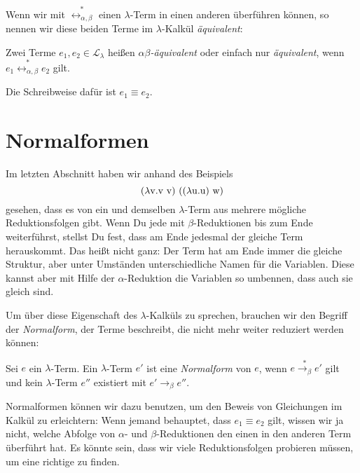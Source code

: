 Wenn wir mit $\overset{\ast}{\leftrightarrow_{\alpha,\beta}}$ einen
$\lambda$-Term in einen anderen überführen können, so nennen wir diese
beiden Terme im $\lambda$-Kalkül 
\textit{äquivalent}:
%
\begin{definition}
  Zwei Terme $e_1, e_2\in\mathcal{L}_{\lambda}$ heißen
  \textit{$\alpha\beta$-äquivalent} oder einfach nur
  \textit{äquivalent}, wenn
  \(e_1 \overset{\ast}{\leftrightarrow_{\alpha,\beta}} e_2\)
  gilt.

  Die Schreibweise dafür ist \(e_1\equiv e_2\).
\end{definition}

\section{Normalformen}
\label{sec:normalformen}


Im letzten Abschnitt haben wir anhand des Beispiels
\begin{displaymath}
(\lambda \mathrm v .\mathrm v~\mathrm v)~((\lambda \mathrm u.\mathrm u)~\mathrm w)
\end{displaymath}
%
gesehen, dass es von ein und demselben $\lambda$-Term aus mehrere
mögliche Reduktionsfolgen gibt.  Wenn Du jede mit $\beta$-Reduktionen
bis zum Ende weiterführst, stellst Du fest, dass am Ende jedesmal der
gleiche Term herauskommt.  Das heißt nicht ganz: Der Term hat am Ende
immer die gleiche Struktur, aber unter Umständen unterschiedliche
Namen für die Variablen.  Diese kannst aber mit Hilfe der
$\alpha$-Reduktion die Variablen so umbennen, dass auch sie gleich sind.

Um über diese Eigenschaft des $\lambda$-Kalküls zu sprechen, brauchen
wir den Begriff der \textit{Normalform}, der Terme beschreibt, die
nicht mehr weiter reduziert werden können:
%
\begin{definition}[Normalform]
  Sei $e$ ein $\lambda$-Term.  Ein $\lambda$-Term $e'$ ist eine
  \textit{Normalform} von $e$, wenn
  $e\overset{\ast}{\rightarrow_\beta}e'$ gilt und kein $\lambda$-Term
  $e''$ existiert mit
  $e'\rightarrow_\beta e''$.
\end{definition}
%
Normalformen können wir dazu benutzen, um den Beweis von Gleichungen
im Kalkül zu erleichtern: Wenn jemand behauptet, dass $e_1 \equiv e_2$
gilt, wissen wir ja nicht, welche Abfolge von $\alpha$- und
$\beta$-Reduktionen den einen in den anderen Term überführt hat.  Es
könnte sein, dass wir viele Reduktionsfolgen probieren müssen, um eine
richtige zu finden.

